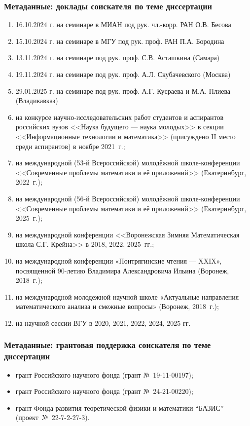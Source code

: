 \begin{frame}\frametitle{Метаданные: доклады соискателя по теме диссертации}
	\begin{enumerate}
		\item
			16.10.2024 г. на семинаре в МИАН под рук. чл.-корр. РАН О.В. Бесова
		\item
			15.10.2024 г. на семинаре в МГУ под рук. проф. РАН П.А. Бородина
		\item
			13.11.2024 г. на семинаре под рук. проф. С.В. Асташкина (Самара)
		\item
			19.11.2024 г. на семинаре под рук. проф. А.Л. Скубачевского (Москва)
		\item
			29.01.2025 г. на семинаре под рук. проф. А.Г. Кусраева и М.А. Плиева (Владикавказ)
		\item
			на конкурсе научно-исследовательских работ студентов и аспирантов российских вузов
			<<Наука будущего --- наука молодых>> в секции <<Информационные технологии и математика>>
			(присуждено II место среди аспирантов) в ноябре 2021~г.;
		\item
			на международной (53-й Всероссийской) молодёжной школе-конференции
			<<Современные проблемы математики и её приложений>>
			(Екатеринбург, 2022~г.);
		\item
			на международной (56-й Всероссийской) молодёжной школе-конференции
			<<Современные проблемы математики и её приложений>>
			(Екатеринбург, 2025~г.);
		\item
			на международной конференции <<Воронежская Зимняя Математическая школа С.Г. Крейна>> в 2018, 2022, 2025~гг.;
		\item
			на международной конференции «Понтрягинские чтения — XXIX», посвященной 90-летию Владимира Александровича Ильина (Воронеж, 2018~г.);
		\item
			на международной молодежной научной школе «Актуальные направления математического анализа и смежные вопросы» (Воронеж, 2018~г.);
		\item
			на научной сессии ВГУ в 2020, 2021, 2022, 2024, 2025 гг.

	\end{enumerate}
\end{frame}

\begin{frame}\frametitle{Метаданные: грантовая поддержка соискателя по теме диссертации}
	\begin{itemize}
		\item
			грант Российского научного фонда (грант №~19-11-00197);
		\medskip
		\item
			грант Российского научного фонда (грант №~24-21-00220);
		\medskip
		\item
			грант Фонда развития теоретической физики и математики ``БАЗИС'' (проект~№~22-7-2-27-3).
	\end{itemize}
\end{frame}
